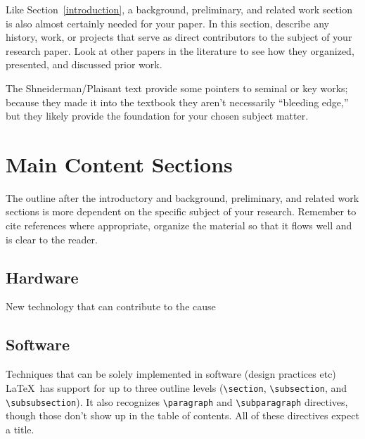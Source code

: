 \documentclass{article}
\begin{document}
Like Section~\ref{introduction}, a background, preliminary, and related work section is also almost certainly needed for your paper.  In this section, describe any history, work, or projects that serve as direct contributors to the subject of your research paper.  Look at other papers in the literature to see how they organized, presented, and discussed prior work.

The Shneiderman/Plaisant text \cite{dui} provide some pointers to seminal or key works; because they made it into the textbook they aren't necessarily ``bleeding edge,'' but they likely provide the foundation for your chosen subject matter.

\section{Main Content Sections}

The outline after the introductory and background, preliminary, and related work sections is more dependent on the specific subject of your research.  Remember to cite references where appropriate, organize the material so that it flows well and is clear to the reader.

\subsection{Hardware}
New technology that can contribute to the cause
\subsection{Software}
Techniques that can be solely implemented in software (design practices etc)
\LaTeX\ has support for up to three outline levels (\verb!\section!, \verb!\subsection!, and \verb!\subsubsection!).  It also recognizes \verb!\paragraph! and \verb!\subparagraph! directives, though those don't show up in the table of contents.  All of these directives expect a title.
\end{document}
